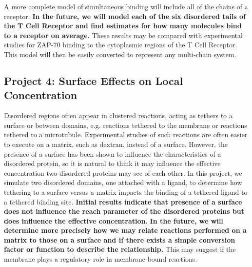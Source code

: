 \documentclass[onecolumn]{article}
\begin{document}
A more complete model of simultaneous binding will include all of the chains of a receptor. \textbf{In the future, we will model each of the six disordered tails of the T Cell Receptor and find estimates for how many molecules bind to a receptor on average.} These results may be compared with experimental studies for ZAP-70 binding to the cytoplasmic regions of the T Cell Receptor. This model will then be easily converted to represent any multi-chain system.

\subsection*{Project 4: Surface Effects on Local Concentration}

Disordered regions often appear in clustered reactions, acting as tethers to a surface or between domains, e.g. reactions tethered to the membrane or reactions tethered to a microtubule. Experimental studies of such reactions are often easier to execute on a matrix, such as dextran, instead of a surface. However, the presence of a surface has been shown to influence the characteristics of a disordered protein, so it is natural to think it may influence the effective concentration two disordered proteins may see of each other. In this project, we simulate two disordered domains, one attached with a ligand, to determine how tethering to a surface versus a matrix impacts the binding of a tethered ligand to a tethered binding site. \textbf{Initial results indicate that presence of a surface does not influence the reach parameter of the disordered proteins but does influence the effective concentration.} \textbf{In the future, we will determine more precisely how we may relate reactions performed on a matrix to those on a surface and if there exists a simple conversion factor or function to describe the relationship.} This may suggest if the membrane plays a regulatory role in membrane-bound reactions.






\end{document}
